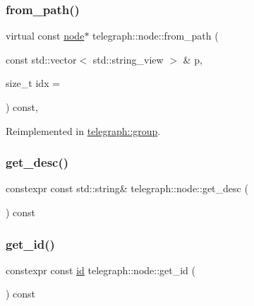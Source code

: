 \subsubsection{\texorpdfstring{from\+\_\+path()}{from\_path()}\hspace{0.1cm}{\footnotesize\ttfamily [2/2]}}
{\footnotesize\ttfamily virtual const \hyperlink{classtelegraph_1_1node}{node}$\ast$ telegraph\+::node\+::from\+\_\+path (\begin{DoxyParamCaption}\item[{const std\+::vector$<$ std\+::string\+\_\+view $>$ \&}]{p,  }\item[{size\+\_\+t}]{idx = {} }\end{DoxyParamCaption}) const\hspace{0.3cm}{\ttfamily [inline]}, {\ttfamily [virtual]}}



Reimplemented in \hyperlink{classtelegraph_1_1group_ad4ed6177fee328ec3702d01a881a33ee}{telegraph\+::group}.

\mbox{\label{classtelegraph_1_1node_aff9478f841f7f791af1cd60513877440}} 
\subsubsection{\texorpdfstring{get\+\_\+desc()}{get\_desc()}}
{\footnotesize\ttfamily constexpr const std\+::string\& telegraph\+::node\+::get\+\_\+desc (\begin{DoxyParamCaption}{ }\end{DoxyParamCaption}) const\hspace{0.3cm}{\ttfamily [inline]}}

\mbox{\label{classtelegraph_1_1node_a8067bd46e650371084576234acfb8289}} 
\subsubsection{\texorpdfstring{get\+\_\+id()}{get\_id()}}
{\footnotesize\ttfamily constexpr const \hyperlink{classtelegraph_1_1node_a90bc576d668ed141d5354a06aa9c8d9a}{id} telegraph\+::node\+::get\+\_\+id (\begin{DoxyParamCaption}{ }\end{DoxyParamCaption}) const\hspace{0.3cm}{\ttfamily [inline]}}

